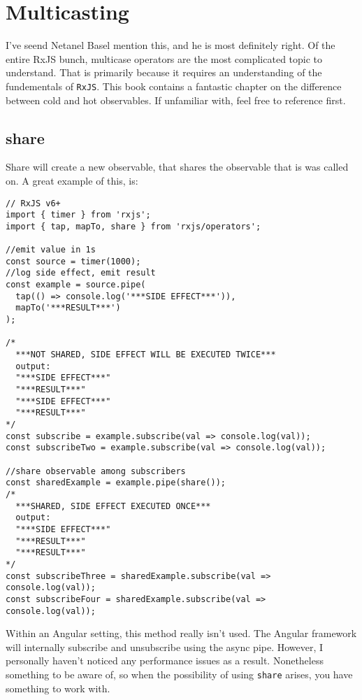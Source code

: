 \chapter{Multicasting}
I've seend Netanel Basel mention this, and he is most definitely right. Of the
entire RxJS bunch, multicase operators are the most complicated topic to 
understand. That is primarily because it requires an understanding of the fundementals of \lstinline{RxJS}. This book contains a fantastic chapter on the difference between cold and hot observables. If unfamiliar with, feel free to reference first.

\section{share}
Share will create a new observable, that shares the observable that is was called on. A great example of this, is: 
\begin{lstlisting}
// RxJS v6+
import { timer } from 'rxjs';
import { tap, mapTo, share } from 'rxjs/operators';

//emit value in 1s
const source = timer(1000);
//log side effect, emit result
const example = source.pipe(
  tap(() => console.log('***SIDE EFFECT***')),
  mapTo('***RESULT***')
);

/*
  ***NOT SHARED, SIDE EFFECT WILL BE EXECUTED TWICE***
  output:
  "***SIDE EFFECT***"
  "***RESULT***"
  "***SIDE EFFECT***"
  "***RESULT***"
*/
const subscribe = example.subscribe(val => console.log(val));
const subscribeTwo = example.subscribe(val => console.log(val));

//share observable among subscribers
const sharedExample = example.pipe(share());
/*
  ***SHARED, SIDE EFFECT EXECUTED ONCE***
  output:
  "***SIDE EFFECT***"
  "***RESULT***"
  "***RESULT***"
*/
const subscribeThree = sharedExample.subscribe(val => console.log(val));
const subscribeFour = sharedExample.subscribe(val => console.log(val));  
\end{lstlisting}

Within an Angular setting, this method really isn't used. The Angular framework will internally subscribe and unsubscribe using the async pipe. However, I personally haven't noticed any performance issues as a result. Nonetheless something to be aware of, so when the possibility of using \lstinline{share} arises, you have something to work with. 